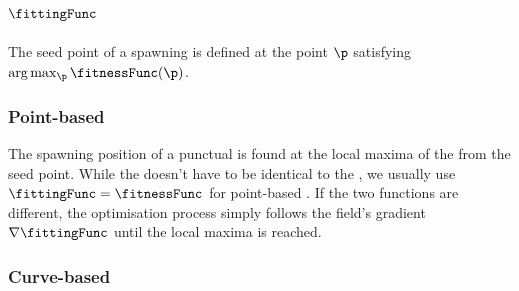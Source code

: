 \subsection{ $\fittingFunc$}
The seed point of a spawning  is defined at the point $\p$ satisfying $\arg \max_\p \fitnessFunc(\p) $.

\subsubsection{Point-based }
The spawning position of a punctual  is found at the local maxima of the  from the seed point. While the  doesn't have to be identical to the , we usually use $\fittingFunc = \fitnessFunc$ for point-based . If the two functions are different, the optimisation process simply follows the field's gradient $\nabla \fittingFunc$ until the local maxima is reached.

\subsubsection{Curve-based }


